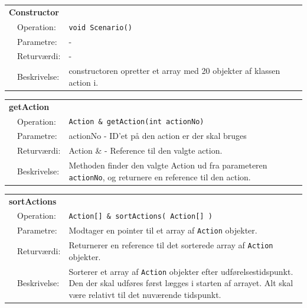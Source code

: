 \begin{table}[h]
\begin{tabularx}{\textwidth}{p{0.6 cm} l X} %
\multicolumn{3}{l}{\textbf{Constructor}}\\
& Operation: & 
\texttt{void Scenario()}  
\\ & Parametre: & 
-
\\ & Returværdi: & 
-
\\ & Beskrivelse: & 
constructoren opretter et array med 20 objekter af klassen action i.
\\ \end{tabularx}
\end{table}

\begin{table}[h]
\begin{tabularx}{\textwidth}{p{0.6 cm} l X} %
\multicolumn{3}{l}{\textbf{getAction}}\\
& Operation: & 
\texttt{Action \& getAction(int actionNo)}  
\\ & Parametre: & 
actionNo - ID'et på den action er der skal bruges
\\ & Returværdi: & 
Action \& - Reference til den valgte action.
\\ & Beskrivelse: & 
Methoden finder den valgte Action ud fra parameteren \texttt{actionNo}, og returnere en reference til den action.
\\ \end{tabularx}
\end{table}
\clearpage

\begin{table}[h]
\begin{tabularx}{\textwidth}{p{0.6 cm} l X} %
\multicolumn{3}{l}{\textbf{sortActions}}\\
& Operation: & 
\texttt{Action[] \& sortActions( Action[] )}  
\\ & Parametre: & 
Modtager en pointer til et array af \texttt{Action} objekter.
\\ & Returværdi: & 
Returnerer en reference til det sorterede array af \texttt{Action} objekter.
\\ & Beskrivelse: & 
Sorterer et array af \texttt{Action} objekter efter udførelsestidspunkt. Den der skal udføres først lægges i starten af arrayet. Alt skal være relativt til det nuværende tidspunkt.
\\ \end{tabularx}
\end{table}

